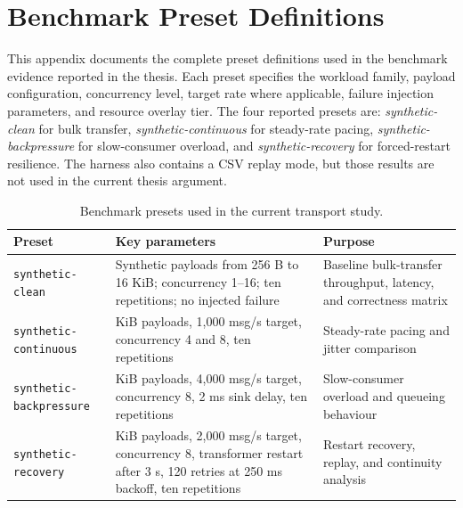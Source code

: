 \section{Benchmark Preset Definitions}
\label{app:presets}

This appendix documents the complete preset definitions used in the benchmark evidence reported in the thesis. Each preset specifies the workload family, payload configuration, concurrency level, target rate where applicable, failure injection parameters, and resource overlay tier. The four reported presets are: \emph{synthetic-clean} for bulk transfer, \emph{synthetic-continuous} for steady-rate pacing, \emph{synthetic-backpressure} for slow-consumer overload, and \emph{synthetic-recovery} for forced-restart resilience. The harness also contains a CSV replay mode, but those results are not used in the current thesis argument.

\begin{table}[H]
    \centering
    \footnotesize
    \caption{Benchmark presets used in the current transport study.}
    \label{tab:appendix-presets}
    \setlength{\tabcolsep}{6pt}
    \renewcommand{\arraystretch}{1.08}
    \begin{tabularx}{\textwidth}{>{\raggedright\arraybackslash}p{}>{\raggedright\arraybackslash}X>{\raggedright\arraybackslash}X}
        \toprule
        Preset & Key parameters & Purpose \\
        \midrule
        \texttt{synthetic-clean} & Synthetic payloads from 256 B to 16 KiB; concurrency 1--16; ten repetitions; no injected failure & Baseline bulk-transfer throughput, latency, and correctness matrix \\
        \texttt{synthetic-continuous} & 1 KiB payloads, 1{,}000 msg/s target, concurrency 4 and 8, ten repetitions & Steady-rate pacing and jitter comparison \\
        \texttt{synthetic-backpressure} & 1 KiB payloads, 4{,}000 msg/s target, concurrency 8, 2 ms sink delay, ten repetitions & Slow-consumer overload and queueing behaviour \\
        \texttt{synthetic-recovery} & 4 KiB payloads, 2{,}000 msg/s target, concurrency 8, transformer restart after 3 s, 120 retries at 250 ms backoff, ten repetitions & Restart recovery, replay, and continuity analysis \\
        \bottomrule
    \end{tabularx}
\end{table}

